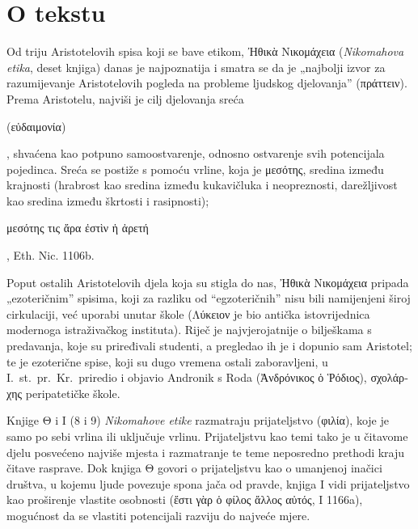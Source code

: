 


\section*{O tekstu}

Od triju Aristotelovih spisa koji se bave etikom, \textgreek{Ἠθικὰ Νικομάχεια} (\textit{Nikomahova etika}, deset knjiga) danas je najpoznatija i smatra se da je „najbolji izvor za razumijevanje Aristotelovih pogleda na probleme ljudskog djelovanja'' (\textgreek{πράττειν}). Prema Aristotelu, najviši je cilj djelovanja sreća \begin{greek}(εὐδαιμονία)\end{greek}, shvaćena kao potpuno samoostvarenje, odnosno ostvarenje svih potencijala pojedinca. Sreća se postiže s pomoću vrline, koja je μεσότης, sredina između krajnosti (hrabrost kao sredina između kukavičluka i neopreznosti, darežljivost kao sredina između škrtosti i rasipnosti); \begin{greek}μεσότης τις ἄρα ἐστὶν ἡ ἀρετή\end{greek}, Eth. Nic. 1106b.

Poput ostalih Aristotelovih djela koja su stigla do nas, \textgreek{Ἠθικὰ Νικομάχεια} pripada „ezoteričnim'' spisima, koji za razliku od ``egzoteričnih'' nisu bili namijenjeni široj cirkulaciji, već uporabi unutar škole (\textgreek{Λύκειον} je bio antička istovrijednica modernoga istraživačkog instituta). Riječ je najvjerojatnije o bilješkama s predavanja, koje su priređivali studenti, a pregledao ih je i dopunio sam Aristotel; te je ezoterične spise, koji su dugo vremena ostali zaboravljeni, u I.~st.\ pr.~Kr.\ priredio i objavio Andronik s Roda \textgreek{(Ἀνδρόνικος ὁ Ῥόδιος), σχολάρχης} peripatetičke škole.

Knjige Θ i Ι (8 i 9) \textit{Nikomahove etike} razmatraju prijateljstvo (\textgreek{φιλία}), koje je samo po sebi vrlina ili uključuje vrlinu. Prijateljstvu kao temi tako je u čitavome djelu posvećeno najviše mjesta i razmatranje te teme neposredno prethodi kraju čitave rasprave. Dok knjiga Θ govori o prijateljstvu kao o umanjenoj inačici društva, u kojemu ljude povezuje spona jača od pravde, knjiga Ι vidi prijateljstvo kao proširenje vlastite osobnosti (\textgreek{ἔστι γὰρ ὁ φίλος ἄλλος αὐτός}, Ι 1166a), mogućnost da se vlastiti potencijali razviju do najveće mjere.

